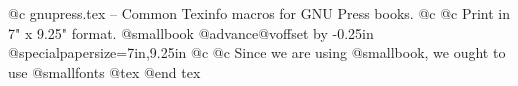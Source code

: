 @c gnupress.tex -- Common Texinfo macros for GNU Press books.
@c
@c Print in 7" x 9.25" format.
@smallbook
@advance@voffset by -0.25in
@special{papersize=7in,9.25in}
@c
@c Since we are using @smallbook, we ought to use @smallfonts
@tex
\global\let\lisporig=\lisp
\gdef\lisp{\smallexamplefonts\lisporig}%
\global\let\exampleorig=\example
\gdef\example{\smallexamplefonts\exampleorig}%
\global\let\displayorig=\display
\gdef\display{\smallexamplefonts\displayorig}%
\global\let\formatorig=\format
\gdef\format{\smallexamplefonts\formatorig}%
@end tex
